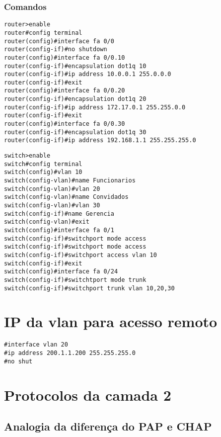 \documentclass[]{article}
\begin{document}
\subsubsection{Comandos}\label{comandos-1}

\begin{verbatim}
router>enable
router#config terminal
router(config)#interface fa 0/0
router(config-if)#no shutdown
router(config)#interface fa 0/0.10
router(config-if)#encapsulation dot1q 10
router(config-if)#ip address 10.0.0.1 255.0.0.0
router(config-if)#exit
router(config)#interface fa 0/0.20
router(config-if)#encapsulation dot1q 20
router(config-if)#ip address 172.17.0.1 255.255.0.0
router(config-if)#exit
router(config)#interface fa 0/0.30
router(config-if)#encapsulation dot1q 30
router(config-if)#ip address 192.168.1.1 255.255.255.0
\end{verbatim}

\begin{verbatim}
switch>enable
switch#config terminal
switch(config)#vlan 10
switch(config-vlan)#name Funcionarios
switch(config-vlan)#vlan 20
switch(config-vlan)#name Convidados
switch(config-vlan)#vlan 30
switch(config-if)#name Gerencia
switch(config-vlan)#exit
switch(config)#interface fa 0/1
switch(config-if)#switchport mode access
switch(config-if)#switchport mode access
switch(config-if)#switchport access vlan 10
switch(config-if)#exit
switch(config)#interface fa 0/24
switch(config-if)#switchtport mode trunk
switch(config-if)#switchport trunk vlan 10,20,30
\end{verbatim}

\section{IP da vlan para acesso
remoto}\label{ip-da-vlan-para-acesso-remoto}

\begin{verbatim}
#interface vlan 20 
#ip address 200.1.1.200 255.255.255.0 
#no shut 
\end{verbatim}

\section{Protocolos da camada 2}\label{protocolos-da-camada-2}

\subsection{Analogia da diferença do PAP e
CHAP}\label{analogia-da-diferenuxe7a-do-pap-e-chap}
\end{document}
